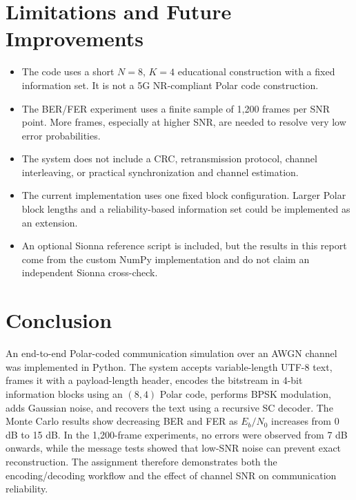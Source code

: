\documentclass[12pt,a4paper]{article}
\begin{document}
\section{Limitations and Future Improvements}
\begin{itemize}
  \item The code uses a short $N=8$, $K=4$ educational construction with a fixed information set. It is not a 5G NR-compliant Polar code construction.
  \item The BER/FER experiment uses a finite sample of 1,200 frames per SNR point. More frames, especially at higher SNR, are needed to resolve very low error probabilities.
  \item The system does not include a CRC, retransmission protocol, channel interleaving, or practical synchronization and channel estimation.
  \item The current implementation uses one fixed block configuration. Larger Polar block lengths and a reliability-based information set could be implemented as an extension.
  \item An optional Sionna reference script is included, but the results in this report come from the custom NumPy implementation and do not claim an independent Sionna cross-check.
\end{itemize}

\section{Conclusion}
An end-to-end Polar-coded communication simulation over an AWGN channel was implemented in Python. The system accepts variable-length UTF-8 text, frames it with a payload-length header, encodes the bitstream in 4-bit information blocks using an $(8,4)$ Polar code, performs BPSK modulation, adds Gaussian noise, and recovers the text using a recursive SC decoder. The Monte Carlo results show decreasing BER and FER as $E_b/N_0$ increases from 0 dB to 15 dB. In the 1,200-frame experiments, no errors were observed from 7 dB onwards, while the message tests showed that low-SNR noise can prevent exact reconstruction. The assignment therefore demonstrates both the encoding/decoding workflow and the effect of channel SNR on communication reliability.

\end{document}
